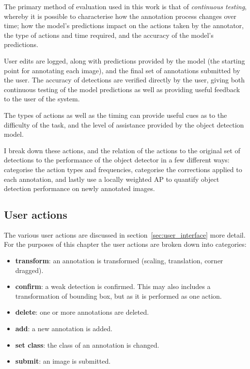 The primary method of evaluation used in this work is that of \emph{continuous testing}, whereby it is possible to characterise how the annotation process changes over time; how the model's predictions impact on the actions taken by the annotator, the type of actions and time required, and the accuracy of the model's predictions.

User edits are logged, along with predictions provided by the model (the starting point for annotating each image), and the final set of annotations submitted by the user. The accuracy of detections are verified directly by the user, giving both continuous testing of the model predictions as well as providing useful feedback to the user of the system. 

The types of actions as well as the timing can provide useful cues as to the difficulty of the task, and the level of assistance provided by the object detection model. 

I break down these actions, and the relation of the actions to the original set of detections to the performance of the object detector in a few different ways: categorise the action types and frequencies, categorise the corrections applied to each annotation, and lastly use a locally weighted \gls{AP} to quantify object detection performance on newly annotated images.

\subsection{User actions}

The various user actions are discussed in section~\ref{sec:user_interface} more detail. For the purposes of this chapter the user actions are broken down into categories:

\begin{itemize}
    \item {\bf transform}: an annotation is transformed (scaling, translation, corner dragged).
    \item {\bf confirm}: a weak detection is confirmed. This may also includes a transformation of bounding box, but as it is performed as one action.
    \item {\bf delete}: one or more annotations are deleted.
    \item {\bf add}: a new annotation is added.
    \item {\bf set class}: the class of an annotation is changed.    
    \item {\bf submit}: an image is submitted.    
\end{itemize}

